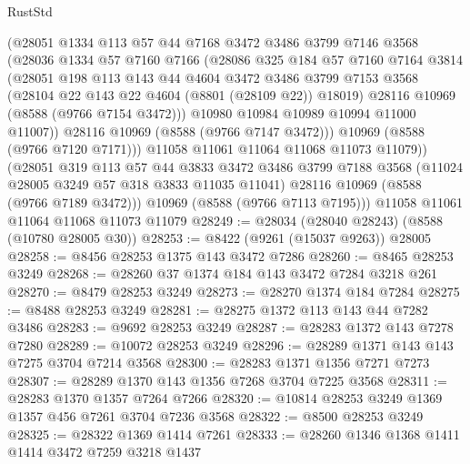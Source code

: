 \begin{lexlean}{RustStd}
\begin{coremodule}
            (@28051
              @1334
              @113
              @57
              @44
              @7168
              @3472
              @3486
              @3799
              @7146
              @3568
              (@28036
                @1334
                @57
                @7160
                @7166
                (@28086
                  @325
                  @184
                  @57
                  @7160
                  @7164
                  @3814
                  (@28051
                    @198
                    @113
                    @143
                    @44
                    @4604
                    @3472
                    @3486
                    @3799
                    @7153
                    @3568
                    (@28104 @22 @143 @22 @4604 (@8801 (@28109 @22)) @18019)
                    @28116
                    @10969
                    (@8588 (@9766 @7154 @3472)))
                  @10980
                  @10984
                  @10989
                  @10994
                  @11000
                  @11007))
              @28116
              @10969
              (@8588 (@9766 @7147 @3472)))
            @10969
            (@8588 (@9766 @7120 @7171)))
          @11058
          @11061
          @11064
          @11068
          @11073
          @11079))
      (@28051
        @319
        @113
        @57
        @44
        @3833
        @3472
        @3486
        @3799
        @7188
        @3568
        (@11024 @28005 @3249 @57 @318 @3833 @11035 @11041)
        @28116
        @10969
        (@8588 (@9766 @7189 @3472)))
      @10969
      (@8588 (@9766 @7113 @7195)))
    @11058
    @11061
    @11064
    @11068
    @11073
    @11079
@28249 := @28034 (@28040 @28243) (@8588 (@10780 @28005 @30))
@28253 := @8422 (@9261 (@15037 @9263)) @28005
@28258 := @8456 @28253 @1375 @143 @3472 @7286
@28260 := @8465 @28253 @3249
@28268 := @28260 @37 @1374 @184 @143 @3472 @7284 @3218 @261
@28270 := @8479 @28253 @3249
@28273 := @28270 @1374 @184 @7284
@28275 := @8488 @28253 @3249
@28281 := @28275 @1372 @113 @143 @44 @7282 @3486
@28283 := @9692 @28253 @3249
@28287 := @28283 @1372 @143 @7278 @7280
@28289 := @10072 @28253 @3249
@28296 := @28289 @1371 @143 @143 @7275 @3704 @7214 @3568
@28300 := @28283 @1371 @1356 @7271 @7273
@28307 := @28289 @1370 @143 @1356 @7268 @3704 @7225 @3568
@28311 := @28283 @1370 @1357 @7264 @7266
@28320 := @10814 @28253 @3249 @1369 @1357 @456 @7261 @3704 @7236 @3568
@28322 := @8500 @28253 @3249
@28325 := @28322 @1369 @1414 @7261
@28333 := @28260 @1346 @1368 @1411 @1414 @3472 @7259 @3218 @1437

\end{coremodule}
\end{lexlean}
